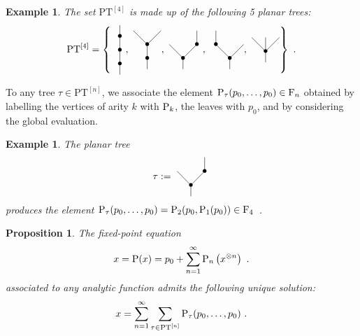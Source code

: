 \documentclass[twoside, 10pt]{amsart}
\newtheorem{example}[lemma]{Example}
\newtheorem{proposition}[lemma]{Proposition}
\begin{document}
\begin{example}
The set $\mathrm{PT}^{[4]}$ is made up of the following 5 planar trees:
\[\mathrm{PT}^{[4]}=\left\{
\vcenter{\hbox{
\begin{tikzpicture}[yscale=0.5,xscale=0.5]
\node at (0,1) {$\bullet$};
\node at (0,2) {$\bullet$};
\node at (0,3) {$\bullet$};
\draw (0,0.2) -- (0,3.8);
\end{tikzpicture}}}, 
\vcenter{\hbox{
\begin{tikzpicture}[yscale=0.5,xscale=0.5]
\node at (0,1) {$\bullet$};
\node at (0,2) {$\bullet$};
\draw (0,0.2) -- (0,2) -- (1,3) ;
\draw (0,2) -- (-1, 3);
\end{tikzpicture}}}, 
\vcenter{\hbox{
\begin{tikzpicture}[yscale=0.5,xscale=0.5]
\node at (0,1) {$\bullet$};
\node at (1,2) {$\bullet$};
\draw (0,0.2) -- (0,1) -- (1,2)--(1,3) ;
\draw (0,1) -- (-1, 2);
\end{tikzpicture}}}, 
\vcenter{\hbox{
\begin{tikzpicture}[yscale=0.5,xscale=0.5]
\node at (0,1) {$\bullet$};
\node at (-1,2) {$\bullet$};
\draw (0,0.2) -- (0,1) -- (-1,2)--(-1,3) ;
\draw (0,1) -- (1, 2);
\end{tikzpicture}}}, 
\vcenter{\hbox{
\begin{tikzpicture}[yscale=0.5,xscale=0.5]
\node at (0,1) {$\bullet$};
\draw (0,0.2) -- (0,1) -- (-1,2) ;
\draw (0,1) -- (1, 2);
\draw (0,1) -- (0, 2);
\end{tikzpicture}}}
\right\}\ .\]
\end{example}  

To any tree $\tau \in \mathrm{PT}^{[n]}$, we associate the element $\mathrm{P}_\tau(p_0, \ldots, p_0)\in \mathrm{F}_n$ obtained by labelling the vertices of arity $k$ with $\mathrm{P}_k$, the leaves with $p_0$, and by considering the global evaluation. 

\begin{example}
The planar tree 
\[\tau:=\vcenter{\hbox{
\begin{tikzpicture}[yscale=0.5,xscale=0.5]
\node at (0,1) {$\bullet$};
\node at (1,2) {$\bullet$};
\draw (0,0.2) -- (0,1) -- (1,2)--(1,3) ;
\draw (0,1) -- (-1, 2);
\end{tikzpicture}}}
\]
produces the element $\mathrm{P}_\tau(p_0, \ldots, p_0)=\mathrm{P}_2(p_0, \mathrm{P}_1(p_0))\in \mathrm{F}_4$\ .
\end{example}


\begin{proposition}\label{prop:FixPtEqua}
The fixed-point equation 
\begin{eqnarray}\label{eqn:FixPt}
x=\mathrm{P}(x)=p_0+\sum_{n=1}^{\infty}\mathrm{P}_n\left(x^{\otimes n}\right)\ .
\end{eqnarray}
associated to any analytic function admits the following  unique solution:
\[
x=\sum_{n=1}^\infty \sum_{\tau \in \mathrm{PT}^{[n]}} \mathrm{P}_\tau(p_0, \ldots, p_0)\ .
\]
\end{proposition}
\end{document}
